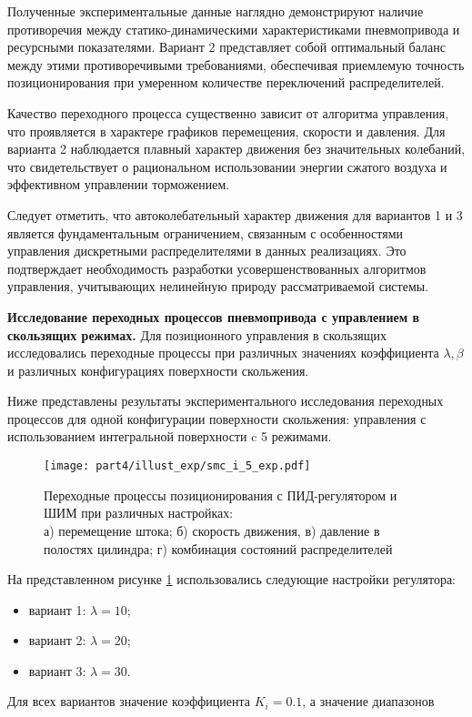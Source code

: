 Полученные экспериментальные данные наглядно демонстрируют наличие противоречия между статико-динамическими
характеристиками пневмопривода и ресурсными показателями. Вариант 2 представляет собой оптимальный баланс между
этими противоречивыми требованиями, обеспечивая приемлемую точность позиционирования при умеренном количестве переключений распределителей.

Качество переходного процесса существенно зависит от алгоритма управления, что проявляется в характере графиков перемещения,
скорости и давления. Для варианта 2 наблюдается плавный характер движения без значительных колебаний, что свидетельствует о
рациональном использовании энергии сжатого воздуха и эффективном управлении торможением.

Следует отметить, что автоколебательный характер движения для вариантов 1 и 3 является фундаментальным ограничением,
связанным с особенностями управления дискретными распределителями в данных реализациях. Это подтверждает необходимость
разработки усовершенствованных алгоритмов управления, учитывающих нелинейную природу рассматриваемой системы.

\textbf{Исследование переходных процессов пневмопривода с управлением в скользящих режимах.}
Для позиционного управления в скользящих исследовались переходные процессы при различных значениях
коэффициента $ \lambda, \beta$ и различных конфигурациях поверхности скольжения.

Ниже представлены результаты экспериментального исследования переходных процессов для одной
конфигурации поверхности скольжения:
управления с использованием интегральной поверхности c 5 режимами.

\begin{figure}
	\centering
	\texttt{[image: part4/illust\_exp/smc\_i\_5\_exp.pdf]}
	\caption{Переходные процессы позиционирования с ПИД-регулятором и ШИМ при различных настройках:\\
		а) перемещение штока; б) скорость движения, в) давление в полостях цилиндра; г) комбинация состояний распределителей}
	\label{fig:smc_i_5_exp}
\end{figure}

На представленном рисунке \ref{fig:smc_i_5_exp} использовались следующие настройки регулятора:
\begin{itemize}
	\item вариант 1: $\lambda = 10$;
	\item вариант 2: $\lambda = 20$;
	\item вариант 3: $\lambda = 30$.
\end{itemize}
Для всех вариантов значение коэффициента $K_i=\num{0.1}$, а значение диапазонов


